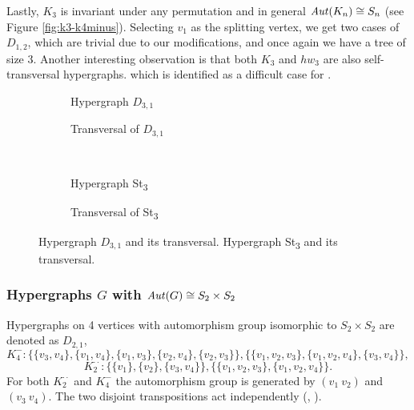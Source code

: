 Lastly, $K_3$ is invariant under any permutation and in general $\mathit{Aut}(K_n)\cong S_n$ (see Figure \ref{fig:k3-k4minus}). Selecting $v_1$ as the splitting vertex, we get two cases of $D_{1,2}$, which are trivial due to our modifications, and once again we have a tree of size 3. Another interesting observation is that both $K_3$ and $hw_3$ are also self-transversal hypergraphs.   which is identified as a difficult case for \FKA.

\begin{figure}[tp]
\centering
\begin{subfigure}{0.45\linewidth}\centering\caption{Hypergraph $D_{3,1}$}\end{subfigure}\hfill
\begin{subfigure}{0.45\linewidth}\centering\caption{Transversal of $D_{3,1}$}\end{subfigure}\\[8pt]
\begin{subfigure}{0.45\linewidth}\centering\caption{Hypergraph St\textsubscript{3}}\end{subfigure}\hfill
\begin{subfigure}{0.45\linewidth}\centering\caption{Transversal of St\textsubscript{3}}\end{subfigure}
\caption{Hypergraph $D_{3,1}$ and its transversal. Hypergraph St\textsubscript{3} and its transversal.}\label{fig:d31-st3}
\end{figure}

\subsubsection*{Hypergraphs $G$ with $\mathit{Aut}(G)\cong S_2\times S_2$}

Hypergraphs on 4 vertices with automorphism group isomorphic to $S_2\times S_2$ are denoted as $D_{2,1}$,
\[
K_4^-:\{\{v_3,v_4\},\{v_1,v_4\},\{v_1,v_3\},\{v_2,v_4\},\{v_2,v_3\}\},\{\{v_1,v_2,v_3\},\{v_1,v_2,v_4\},\{v_3,v_4\}\},
\]
\[
K_2^{\cdot\cdot}:\{\{v_1\},\{v_2\},\{v_3,v_4\}\},\{\{v_1,v_2,v_3\},\{v_1,v_2,v_4\}\}.
\]
For both $K_2^{\cdot\cdot}$ and $K_4^-$ the automorphism group is generated by $(v_1\ v_2)$ and $(v_3\ v_4)$. The two disjoint transpositions act independently (, ).

